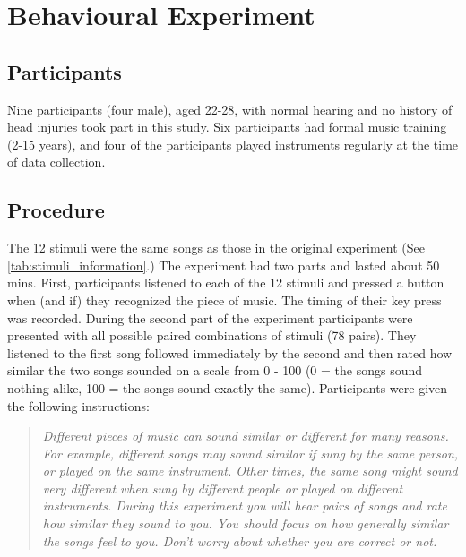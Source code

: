 \chapter{Behavioural Experiment}
\section{Participants}
Nine participants (four male), aged 22-28, with normal hearing and no history of head injuries took part in this study. 
Six participants had formal music training (2-15 years), and four of the participants played instruments regularly at the time of data collection. 
\section{Procedure}
The 12 stimuli were the same songs as those in the original experiment (See \autoref{tab:stimuli_information}.)
The experiment had two parts and lasted about 50 mins.
First, participants listened to each of the 12 stimuli and pressed a button when (and if) they recognized the piece of music.
The timing of their key press was recorded. 
During the second part of the experiment participants were presented with all possible paired combinations of stimuli (78 pairs). 
They listened to the first song followed immediately by the second and then rated how similar the two songs sounded on a scale from 0 - 100 (0 = the songs sound nothing alike, 100 = the songs sound exactly the same).
Participants were given the following instructions:
\begin{quote}\textit{
Different pieces of music can sound similar or different for many reasons.
For example, different songs may sound similar if sung by the same person, or played on the same instrument.
Other times, the same song might sound very different when sung by different people or played on different instruments.
During this experiment you will hear pairs of songs and rate how similar they sound to you.
You should focus on how generally similar the songs feel to you. Don't worry about whether you are correct or not.}
\end{quote}

